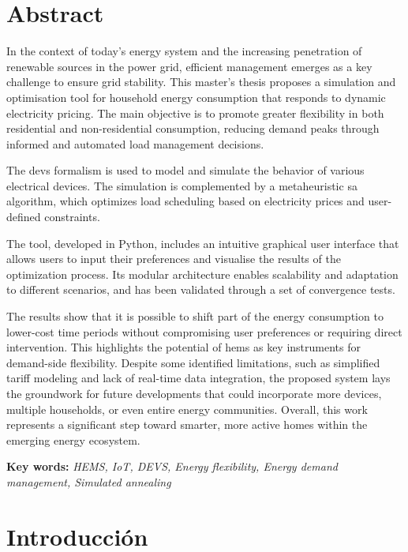 \documentclass[11pt,a4paper]{book}
\begin{document}
\chapter*{Abstract}
In the context of today’s energy system and the increasing penetration of renewable sources in the power grid, efficient management emerges as a key challenge to ensure grid stability. This master's thesis proposes a simulation and optimisation tool for household energy consumption that responds to dynamic electricity pricing. The main objective is to promote greater flexibility in both residential and non-residential consumption, reducing demand peaks through informed and automated load management decisions.

The \gls{devs} formalism is used to model and simulate the behavior of various electrical devices. The simulation is complemented by a metaheuristic \gls{sa} algorithm, which optimizes load scheduling based on electricity prices and user-defined constraints.

The tool, developed in Python, includes an intuitive graphical user interface that allows users to input their preferences and visualise the results of the optimization process. Its modular architecture enables scalability and adaptation to different scenarios, and has been validated through a set of convergence tests.

The results show that it is possible to shift part of the energy consumption to lower-cost time periods without compromising user preferences or requiring direct intervention. This highlights the potential of \gls{hems} as key instruments for demand-side flexibility. Despite some identified limitations, such as simplified tariff modeling and lack of real-time data integration, the proposed system lays the groundwork for future developments that could incorporate more devices, multiple households, or even entire energy communities. Overall, this work represents a significant step toward smarter, more active homes within the emerging energy ecosystem.

\vspace{1cm}

\noindent\textbf{Key words: }\textit{HEMS, IoT, DEVS, Energy flexibility, Energy demand management, Simulated annealing}

\printglossaries
\tableofcontents 
\listoftables
\listoffigures
\lstlistoflistings

\mainmatter

\chapter{Introducción}
\end{document}

